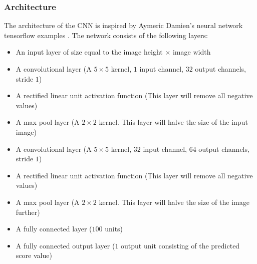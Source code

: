 \documentclass[journal]{IEEEtran}
\begin{document}
\subsubsection{Architecture}
The architecture of the CNN is inspired by Aymeric Damien's neural network tensorflow examples \cite{tensorflow-cnn-example}. The network consists of the following layers:
\begin{itemize}
\item An input layer of size equal to the image height $\times$ image width 
\item A convolutional layer (A $5\times5$ kernel, $1$ input channel, $32$ output channels, stride $1$) 
\item A rectified linear unit activation function (This layer will remove all negative values)
\item A max pool layer (A $2\times2$ kernel. This layer will halve the size of the input image)
\item A convolutional layer (A $5\times5$ kernel, $32$ input channel, $64$ output channels, stride $1$)
\item A rectified linear unit activation function (This layer will remove all negative values)
\item A max pool layer (A $2\times2$ kernel. This layer will halve the size of the image further)
\item A fully connected layer ($100$ units) 
\item A fully connected output layer ($1$ output unit consisting of the predicted score value) 
\end{itemize}
\end{document}

